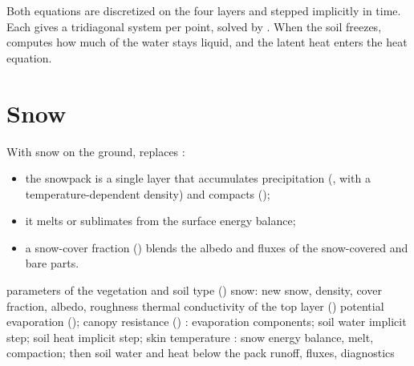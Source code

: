 Both equations are discretized on the four layers and stepped implicitly in time. Each gives a tridiagonal system per
point, solved by . When the soil freezes,  computes how much of the water stays liquid,
and the latent heat enters the heat equation.

\section{Snow}

With snow on the ground,  replaces :
\begin{itemize}
  \item the snowpack is a single layer that accumulates precipitation (, with a temperature-dependent
    density) and compacts ();
  \item it melts or sublimates from the surface energy balance;
  \item a snow-cover fraction () blends the albedo and fluxes of the snow-covered and bare parts.
\end{itemize}

\begin{algorithm}[ht]
\caption{One Noah point step (, simplified).}
\label{alg:noah}
\begin{algorithmic}[1]
\State parameters of the vegetation and soil type ()
\State snow: new snow, density, cover fraction, albedo, roughness
\State thermal conductivity of the top layer ()
\State potential evaporation (); canopy resistance ()
  \State {}: evaporation components; soil water implicit step; soil heat implicit step; skin temperature
\Else
  \State {}: snow energy balance, melt, compaction; then soil water and heat below the pack
\EndIf
\State runoff, fluxes, diagnostics
\end{algorithmic}
\end{algorithm}

